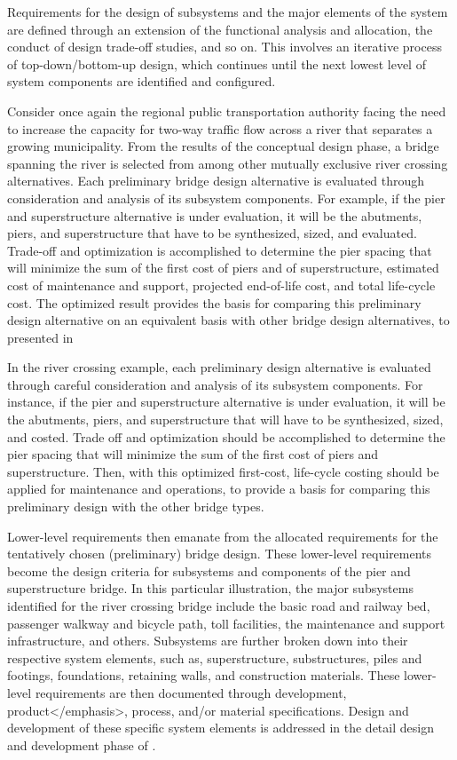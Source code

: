 Requirements for the design of subsystems and the major elements of the system are defined through an extension of the functional analysis and allocation, the conduct of design trade-off studies, and so on. This involves an iterative process of top-down/bottom-up design, which continues until the next lowest level of system components are identified and configured.

Consider once again the regional public transportation authority facing the need to increase the capacity for two-way traffic flow across a river that separates a growing municipality. From the results of the conceptual design phase, a bridge spanning the river is selected from among other mutually exclusive river crossing alternatives. Each preliminary bridge design alternative is evaluated through consideration and analysis of its subsystem components. For example, if the pier and superstructure alternative is under evaluation, it will be the abutments, piers, and superstructure that have to be synthesized, sized, and evaluated. Trade-off and optimization is accomplished to determine the pier spacing that will minimize the sum of the first cost of piers and of superstructure, estimated cost of maintenance and support, projected end-of-life cost, and total life-cycle cost. The optimized result provides the basis for comparing this preliminary design alternative on an equivalent basis with other bridge design alternatives, to presented in 


In the river crossing example, each preliminary design alternative is evaluated through careful consideration and analysis of its subsystem components. For instance, if the pier and superstructure alternative is under evaluation, it will be the abutments, piers, and superstructure that will have to be synthesized, sized, and costed. Trade off and optimization should be accomplished to determine the pier spacing that will minimize the sum of the first cost of piers and superstructure. Then, with this optimized first-cost, life-cycle costing should be applied for maintenance and operations, to provide a basis for comparing this preliminary design with the other bridge types.

Lower-level requirements then emanate from the allocated requirements for the tentatively chosen (preliminary) bridge design. These lower-level requirements become the design criteria for subsystems and components of the pier and superstructure bridge. In this particular illustration, the major subsystems identified for the river crossing bridge include the basic road and railway bed, passenger walkway and bicycle path, toll facilities, the maintenance and support infrastructure, and others. Subsystems are further broken down into their respective system elements, such as, superstructure, substructures, piles and footings, foundations, retaining walls, and construction materials. These lower-level requirements are then documented through development, product</emphasis>, process, and/or material specifications. Design and development of these specific system elements is addressed in the detail design and development phase of .


